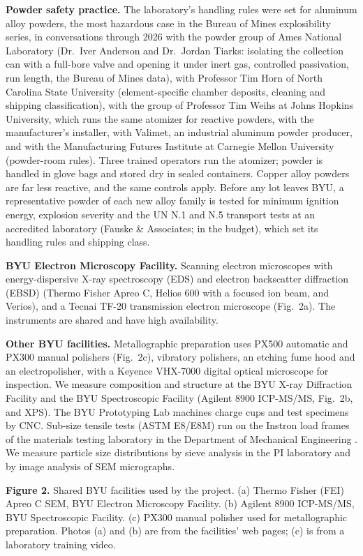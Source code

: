 \textbf{Powder safety practice.} The laboratory's handling rules were set
for aluminum alloy powders, the most hazardous case in the Bureau of Mines
explosibility series, in conversations through 2026 with the powder group of
Ames National Laboratory (Dr.~Iver Anderson and Dr.~Jordan Tiarks: isolating
the collection can with a full-bore valve and opening it under inert gas,
controlled passivation, run length, the Bureau of Mines data), with
Professor Tim Horn of North Carolina State University (element-specific
chamber deposits, cleaning and shipping classification), with the group of
Professor Tim Weihs at Johns Hopkins University, which runs the same
atomizer for reactive powders, with the manufacturer's installer, with
Valimet, an industrial aluminum powder producer, and with the Manufacturing
Futures Institute at Carnegie Mellon University (powder-room rules). Three
trained operators run the atomizer; powder is handled in glove bags and
stored dry in sealed containers. Copper alloy powders are far less reactive,
and the same controls apply. Before any lot leaves BYU, a representative
powder of each new alloy family is tested for minimum ignition energy,
explosion severity and the UN N.1 and N.5 transport tests at an accredited
laboratory (Fauske \& Associates; in the budget), which set its handling
rules and shipping class.

\textbf{BYU Electron Microscopy Facility.} Scanning electron microscopes
with energy-dispersive X-ray spectroscopy (EDS) and electron backscatter
diffraction (EBSD) (Thermo Fisher Apreo C, Helios 600 with a focused ion
beam, and Verios), and a Tecnai TF-20 transmission electron microscope
(Fig.~2a). The instruments are shared and have high availability.

\textbf{Other BYU facilities.} Metallographic preparation uses PX500
automatic and PX300 manual polishers (Fig.~2c), vibratory polishers, an
etching fume hood and an electropolisher, with a Keyence VHX-7000 digital
optical microscope for inspection. We measure composition and structure at
the BYU X-ray Diffraction Facility and the BYU Spectroscopic Facility
(Agilent 8900 ICP-MS/MS, Fig.~2b, and XPS). The BYU Prototyping Lab machines
charge cups and test specimens by CNC. Sub-size tensile tests (ASTM
E8/E8M) run on the Instron load frames of the materials testing laboratory
in the Department of Mechanical Engineering . We measure
particle size distributions by sieve analysis in the PI laboratory and by
image analysis of SEM micrographs.

\textbf{Figure 2.} Shared BYU facilities used by the project. (a) Thermo
Fisher (FEI) Apreo C SEM, BYU Electron Microscopy Facility. (b) Agilent 8900
ICP-MS/MS, BYU Spectroscopic Facility. (c) PX300 manual polisher used for
metallographic preparation. Photos (a) and (b) are from the facilities' web
pages; (c) is from a laboratory training video.

